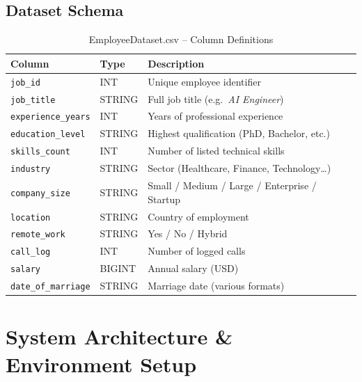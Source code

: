 \documentclass[11pt,a4paper]{article}
\begin{document}
\subsection{Dataset Schema}
\begin{table}[H]
\centering
\caption{EmployeeDataset.csv -- Column Definitions}
\begin{tabularx}{\textwidth}{@{}llX@{}}
\toprule
\textbf{Column} & \textbf{Type} & \textbf{Description} \\
\midrule
\texttt{job\_id}          & INT    & Unique employee identifier \\
\texttt{job\_title}       & STRING & Full job title (e.g.\ \textit{AI Engineer}) \\
\texttt{experience\_years}& INT    & Years of professional experience \\
\texttt{education\_level} & STRING & Highest qualification (PhD, Bachelor, etc.) \\
\texttt{skills\_count}    & INT    & Number of listed technical skills \\
\texttt{industry}         & STRING & Sector (Healthcare, Finance, Technology…) \\
\texttt{company\_size}    & STRING & Small / Medium / Large / Enterprise / Startup \\
\texttt{location}         & STRING & Country of employment \\
\texttt{remote\_work}     & STRING & Yes / No / Hybrid \\
\texttt{call\_log}        & INT    & Number of logged calls \\
\texttt{salary}           & BIGINT & Annual salary (USD) \\
\texttt{date\_of\_marriage}& STRING & Marriage date (various formats) \\
\bottomrule
\end{tabularx}
\end{table}

\section{System Architecture \& Environment Setup}
\end{document}
